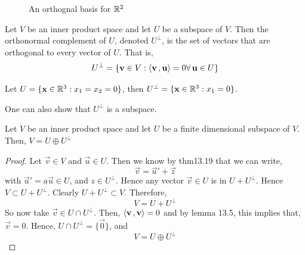 \documentclass{article}
\begin{document}
\begin{figure}[!ht]
  \centering
  \caption{An orthognal basis for $\mathbb{R}^2$}
  \label{fig:OrthogBasis}
\end{figure}

\begin{ndefi}
  Let $V$ be an inner product space and let $U$ be a subspace of $V$. Then the orthonormal complement of $U$, denoted $U^{\bot}$, is the set of vectors that are orthogonal to every vector of $U$. That is,
  $$ U^\bot = \{ \boldsymbol{\mathbf{v}} \in V : \left\langle \boldsymbol{\mathbf{v}}\,, \boldsymbol{\mathbf{u}} \right\rangle = 0 \forall\, \boldsymbol{\mathbf{u}} \in U \} $$
\end{ndefi}

\begin{eg}
  Let $U = \{\boldsymbol{\mathbf{x}} \in \mathbb{R}^3 : x_1 = x_2 = 0\}$, then $U^\bot = \{ \boldsymbol{\mathbf{x}} \in \mathbb{R}^3 : x_1 = 0\}$.
\end{eg}

One can also show that $U^\bot$ is a subspace.

\begin{nthm}
  Let $V$ be an inner product space and let $U$ be a finite dimensional subspace of $V$. Then, $V = U \oplus U^\bot$
\end{nthm}

\begin{proof}
  Let $\vec v\in V$ and $\vec u \in U$. Then we know by thm13.19 that we can write,
  $$ \vec v = \vec u' + \vec z $$
  with $\vec u' = a\vec u \in U$, and $z \in U^\bot$. Hence any vector $\vec v\in U$ is in $U + U^\bot$. Hence $\displaystyle{ V \subset U + U^\bot}$. Clearly $U + U^\bot \subset V$. Therefore,
  $$ V = U + U^\bot $$
  So now take $\vec v \in U \cap U^\bot$. Then, $\displaystyle{\left\langle \boldsymbol{\mathbf{v}}\,, \boldsymbol{\mathbf{v}} \right\rangle = 0}$ and by lemma 13.5, this implies that, $\vec v = 0$. Hence, $U \cap U^\bot = \{\vec 0\}$, and
  $$ V = U \oplus U^\bot $$
\end{proof}
\end{document}

